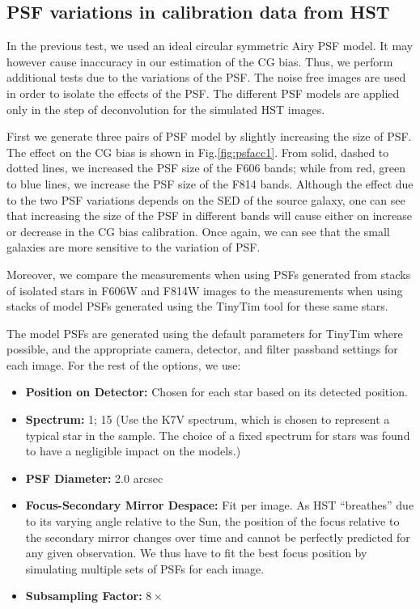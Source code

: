 \documentclass[useAMS,usenatbib]{mn2e}
\begin{document}
\subsection{PSF variations in calibration data from HST}

In the previous test, we used an ideal circular symmetric Airy PSF
model. It may however cause inaccuracy in our estimation of the CG
bias. Thus, we perform additional tests due to the variations of the
PSF. The noise free images are used in order to isolate the effects of
the PSF. The different PSF models are applied only in the step of
deconvolution for the simulated HST images.

First we generate three pairs of PSF model by slightly increasing the
size of PSF. The effect on the CG bias is shown in
Fig.\ref{fig:psfacc1}. From solid, dashed to dotted lines, we
increased the PSF size of the F606 bands; while from red, green to
blue lines, we increase the PSF size of the F814 bands. Although the
effect due to the two PSF variations depends on the SED of the source
galaxy, one can see that increasing the size of the PSF in different
bands will cause either on increase or decrease in the CG bias
calibration. Once again, we can see that the small galaxies are more
sensitive to the variation of PSF.

Moreover, we compare the measurements when using PSFs generated from
stacks of isolated stars in F606W and F814W images to the measurements
when using stacks of model PSFs generated using the TinyTim
\citep{2011SPIE.8127E..0JK} tool for these same stars.

The model PSFs are generated using the default parameters for TinyTim
where possible, and the appropriate camera, detector, and filter
passband settings for each image. For the rest of the options, we use:
\begin{itemize}
  \item \textbf{Position on Detector:} Chosen for each star based on its
detected position.
  \item \textbf{Spectrum:} 1; 15 (Use the K7V spectrum, which is chosen
to represent a typical star in the sample. The choice of a fixed
spectrum for stars was found to have a negligible impact on the
models.)
  \item \textbf{PSF Diameter:} 2.0 arcsec
  \item \textbf{Focus-Secondary Mirror Despace:} Fit per image. As HST
``breathes'' due to its varying angle relative to the Sun, the position
of the focus relative to the secondary mirror changes over time and
cannot be perfectly predicted for any given observation. We thus have to
fit the best focus position by simulating multiple sets of PSFs for each
image.
  \item \textbf{Subsampling Factor:} $8\times$
\end{itemize}
\end{document}
